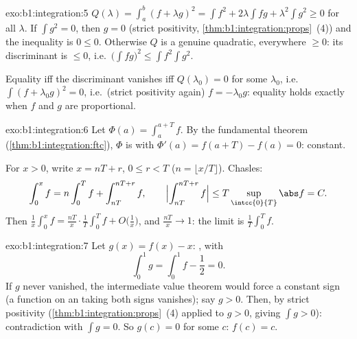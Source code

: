 \begin{solution}{exo:b1:integration:5}
$Q(\lambda) = \int_a^b (f + \lambda g)^2 = \int f^2 + 2\lambda \int
fg + \lambda^2 \int g^2 \geq 0$ for all $\lambda$. If $\int g^2 =
0$, then $g = 0$ (strict positivity,
\cref{thm:b1:integration:props}~(4)) and the inequality is $0 \leq
0$. Otherwise $Q$ is a genuine quadratic, everywhere $\geq 0$: its
discriminant is $\leq 0$, i.e.\ $\bigl(\int fg\bigr)^2 \leq \int
f^2 \int g^2$.

Equality iff the discriminant vanishes iff $Q(\lambda_0) = 0$ for
some $\lambda_0$, i.e.\ $\int (f + \lambda_0 g)^2 = 0$, i.e.\ (strict
positivity again) $f = -\lambda_0 g$: equality holds exactly when
$f$ and $g$ are proportional.
\end{solution}

\begin{solution}{exo:b1:integration:6}
Let $\Phi(a) = \int_a^{a+T} f$. By the fundamental theorem
(\cref{thm:b1:integration:ftc}), $\Phi$ is  with
$\Phi'(a) = f(a + T) - f(a) = 0$: constant.

For $x > 0$, write $x = nT + r$, $0 \leq r < T$ ($n = \lfloor x/T
\rfloor$). Chasles:
\[
\int_0^x f = n \int_0^T f + \int_{nT}^{nT + r} f,
\qquad
\Bigl| \int_{nT}^{nT+r} f \Bigr| \leq T \sup_{\intcc{0}{T}} \abs f
= C .
\]
Then $\frac 1x \int_0^x f = \frac{nT}{x}\cdot\frac 1T \int_0^T f +
O\bigl(\frac 1x\bigr)$, and $\frac{nT}{x} \to 1$: the limit is
$\frac1T \int_0^T f$.
\end{solution}

\begin{solution}{exo:b1:integration:7}
Let $g(x) = f(x) - x$: , with
\[
\int_0^1 g = \int_0^1 f - \frac12 = 0 .
\]
If $g$ never vanished, the intermediate value theorem would force a
constant sign (a  function on an  taking both signs
vanishes); say $g > 0$. Then, by strict positivity
(\cref{thm:b1:integration:props}~(4) applied to $g > 0$, giving
$\int g > 0$): contradiction with $\int g = 0$. So $g(c) = 0$ for
some $c$: $f(c) = c$.
\end{solution}

